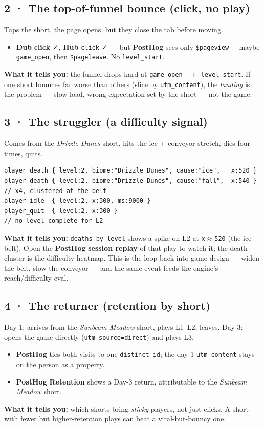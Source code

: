 \documentclass[11pt]{article}
\newcommand{\Dub}{\textcolor{dub}{\textbf{Dub}}}
\newcommand{\PH}{\textcolor{ph}{\textbf{PostHog}}}
\newcommand{\Hub}{\textcolor{hub}{\textbf{Hub}}}
\begin{document}
\subsection{2 · The top-of-funnel bounce (click, no play)}
Taps the short, the page opens, but they close the tab before moving.
\begin{itemize}[leftmargin=2.2em,itemsep=1pt,topsep=2pt]
  \item \Dub{} \textbf{click} ✓, \Hub{} \texttt{click} ✓ --- but \PH{} sees only \texttt{\$pageview} + maybe \texttt{game\_open}, then \texttt{\$pageleave}. No \texttt{level\_start}.
\end{itemize}
\textbf{What it tells you:} the funnel drops hard at \texttt{game\_open $\to$ level\_start}. If one
short bounces far worse than others (slice by \texttt{utm\_content}), the \emph{landing} is the
problem --- slow load, wrong expectation set by the short --- not the game.

\subsection{3 · The struggler (a difficulty signal)}
Comes from the \emph{Drizzle Dunes} short, hits the ice + conveyor stretch, dies four times, quits.
\begin{lstlisting}[style=json]
player_death { level:2, biome:"Drizzle Dunes", cause:"ice",   x:520 }
player_death { level:2, biome:"Drizzle Dunes", cause:"fall",  x:540 }   // x4, clustered at the belt
player_idle  { level:2, x:300, ms:9000 }
player_quit  { level:2, x:300 }                                          // no level_complete for L2
\end{lstlisting}
\textbf{What it tells you:} \texttt{deaths-by-level} shows a spike on L2 at \texttt{x$\approx$520}
(the ice belt). Open the \PH{} \textbf{session replay} of that play to watch it; the death cluster
is the difficulty heatmap. This is the loop back into game design --- widen the belt, slow the
conveyor --- and the same event feeds the engine's reach/difficulty eval.

\subsection{4 · The returner (retention by short)}
Day 1: arrives from the \emph{Sunbeam Meadow} short, plays L1--L2, leaves. Day 3: opens the game
directly (\texttt{utm\_source=direct}) and plays L3.
\begin{itemize}[leftmargin=2.2em,itemsep=1pt,topsep=2pt]
  \item \PH{} ties both visits to one \texttt{distinct\_id}; the day-1 \texttt{utm\_content} stays on the person as a property.
  \item \PH{} \textbf{Retention} shows a Day-3 return, attributable to the \emph{Sunbeam Meadow} short.
\end{itemize}
\textbf{What it tells you:} which shorts bring \emph{sticky} players, not just clicks. A short with
fewer but higher-retention plays can beat a viral-but-bouncy one.
\end{document}
